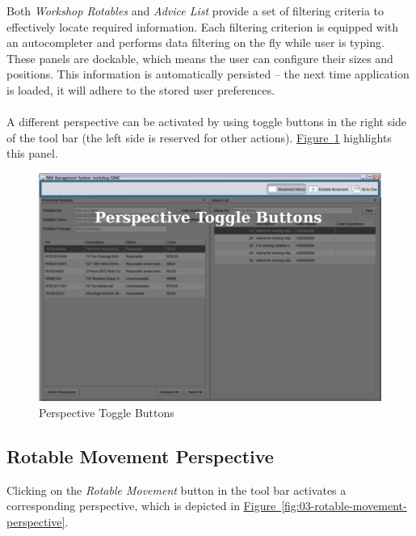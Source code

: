 Both \emph{Workshop Rotables} and \emph{Advice List} provide a set of filtering criteria to effectively locate required information. Each filtering criterion is equipped with an autocompleter and performs data filtering on the fly while user is typing. These panels are dockable, which means the user can configure their sizes and positions. This information is automatically persisted -- the next time application is loaded, it will adhere to the stored user preferences. 
\\\\
A different perspective can be activated by using toggle buttons in the right side of the tool bar (the left side is reserved for other actions). \hyperref[fig:00-perspective-buttons]{Figure~\ref*{fig:00-perspective-buttons}} highlights this panel.

\begin{figure}[!h]
\centering
\includegraphics[scale=0.37]{chapters/02-user-interface/images/00-perspective-buttons.png}
\caption{Perspective Toggle Buttons}\label{fig:00-perspective-buttons}
\end{figure}

\clearpage

\subsection{Rotable Movement Perspective}
Clicking on the \emph{Rotable Movement} button in the tool bar activates a corresponding perspective, which is depicted in \hyperref[fig:04-rotable-movement-perspective-expanded]{Figure~\ref*{fig:03-rotable-movement-perspective}}.

